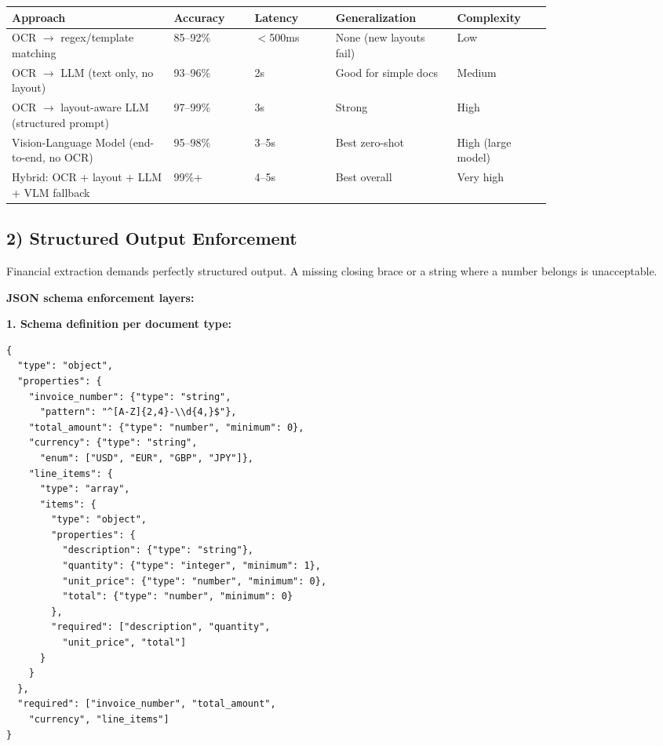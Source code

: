 \begin{tabular}{|p{0.24\linewidth}|p{0.12\linewidth}|p{0.12\linewidth}|p{0.18\linewidth}|p{0.14\linewidth}|}
\hline
\textbf{Approach} & \textbf{Accuracy} & \textbf{Latency} & \textbf{Generalization} & \textbf{Complexity} \\
\hline
OCR $\rightarrow$ regex/template matching & 85--92\% & $<$500ms & None (new layouts fail) & Low \\
\hline
OCR $\rightarrow$ LLM (text only, no layout) & 93--96\% & 2s & Good for simple docs & Medium \\
\hline
OCR $\rightarrow$ layout-aware LLM (structured prompt) & 97--99\% & 3s & Strong & High \\
\hline
Vision-Language Model (end-to-end, no OCR) & 95--98\% & 3--5s & Best zero-shot & High (large model) \\
\hline
Hybrid: OCR + layout + LLM + VLM fallback & 99\%+ & 4--5s & Best overall & Very high \\
\hline
\end{tabular}

\subsection*{2) Structured Output Enforcement}

Financial extraction demands perfectly structured output. A missing closing brace or a string where a number belongs is unacceptable.

\textbf{JSON schema enforcement layers:}

\textbf{1. Schema definition per document type:}

\begin{verbatim}
{
  "type": "object",
  "properties": {
    "invoice_number": {"type": "string",
      "pattern": "^[A-Z]{2,4}-\\d{4,}$"},
    "total_amount": {"type": "number", "minimum": 0},
    "currency": {"type": "string",
      "enum": ["USD", "EUR", "GBP", "JPY"]},
    "line_items": {
      "type": "array",
      "items": {
        "type": "object",
        "properties": {
          "description": {"type": "string"},
          "quantity": {"type": "integer", "minimum": 1},
          "unit_price": {"type": "number", "minimum": 0},
          "total": {"type": "number", "minimum": 0}
        },
        "required": ["description", "quantity",
          "unit_price", "total"]
      }
    }
  },
  "required": ["invoice_number", "total_amount",
    "currency", "line_items"]
}
\end{verbatim}

